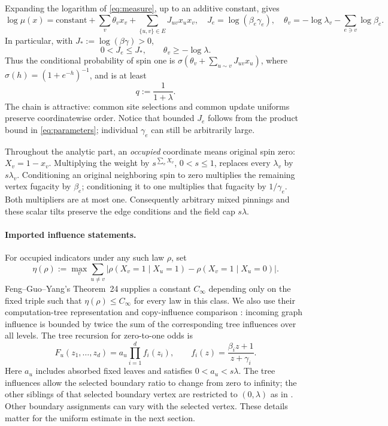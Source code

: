 \documentclass[11pt]{article}
\theoremstyle{remark}\newtheorem{remark}[theorem]{Remark}
\newcommand{\sig}{\sigma}
\begin{document}
Expanding the logarithm of \eqref{eq:measure}, up to an additive constant,
gives
\begin{equation}\label{eq:logistic}
 \log\mu(x)=\text{constant}+\sum_v\theta_vx_v+
 \sum_{\{u,v\}\in E}J_{uv}x_ux_v,
 \quad J_e=\log(\beta_e\gamma_e),\quad
 \theta_v=-\log\lambda_v-\sum_{e\ni v}\log\beta_e.
\end{equation}
In particular, with $J_*:=\log(\beta\gamma)>0$,
\begin{equation}\label{eq:logbounds}
 0<J_e\leq J_*,\qquad \theta_v\geq-\log\lambda.
\end{equation}
Thus the conditional probability of spin one is
$\sig(\theta_v+\sum_{u\sim v}J_{uv}x_u)$, where
$\sig(h)=(1+e^{-h})^{-1}$, and is at least
\begin{equation}\label{eq:q}
 q:=\frac1{1+\lambda}.
\end{equation}
The chain is attractive: common site selections and common update
uniforms preserve coordinatewise order. Notice that bounded $J_e$ follows
from the product bound in \eqref{eq:parameters}; individual $\gamma_e$
can still be arbitrarily large.

Throughout the analytic part, an \emph{occupied} coordinate means original
spin zero: $X_v=1-x_v$. Multiplying the weight by $s^{\sum_vX_v}$,
$0<s\leq1$, replaces every $\lambda_v$ by $s\lambda_v$.
Conditioning an original neighboring spin to zero multiplies the remaining
vertex fugacity by $\beta_e$; conditioning it to one multiplies that
fugacity by $1/\gamma_e$. Both multipliers are at most one. Consequently
arbitrary mixed pinnings and these scalar tilts preserve the edge
conditions and the field cap $s\lambda$.

\paragraph{Imported influence statements.}
For occupied indicators under any such law $\rho$, set
\[
 \eta(\rho):=\max_v\sum_{u\ne v}
 \left|\rho(X_v=1\mid X_u=1)-\rho(X_v=1\mid X_u=0)\right|.
\]
Feng--Guo--Yang's Theorem~24 supplies a constant $C_\infty$ depending
only on the fixed triple such that $\eta(\rho)\leq C_\infty$ for every
law in this class. We also use their computation-tree representation and
copy-influence comparison \cite[Proposition~14, Lemmas~27 and~29,
equation~(15)]{FGY26}:
incoming graph influence is bounded by twice the sum of the corresponding
tree influences over all levels. The tree recursion for zero-to-one odds
is
\begin{equation}\label{eq:tree}
 F_u(z_1,\ldots,z_d)=a_u\prod_{i=1}^d f_i(z_i),\qquad
 f_i(z)=\frac{\beta_i z+1}{z+\gamma_i}.
\end{equation}
Here $a_u$ includes absorbed fixed leaves and satisfies $0<a_u<s\lambda$.
The tree influences allow the selected boundary ratio to change from
zero to infinity; the other siblings of that selected boundary vertex
are restricted to $(0,\lambda)$ as in \cite[Definition~28]{FGY26}.
Other boundary assignments can vary with the selected vertex. These
details matter for the uniform estimate in the next section.
\end{document}
